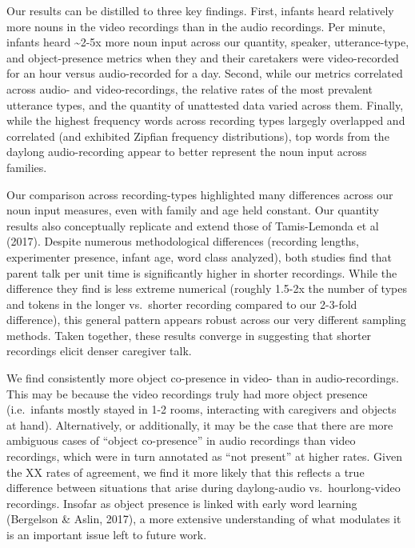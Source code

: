 \documentclass[floatsintext,man]{apa6}
\theoremstyle{definition}
\theoremstyle{definition}
\theoremstyle{definition}
\theoremstyle{remark}
\begin{document}
Our results can be distilled to three key findings. First, infants heard
relatively more nouns in the video recordings than in the audio
recordings. Per minute, infants heard \textasciitilde{}2-5x more noun
input across our quantity, speaker, utterance-type, and object-presence
metrics when they and their caretakers were video-recorded for an hour
versus audio-recorded for a day. Second, while our metrics correlated
across audio- and video-recordings, the relative rates of the most
prevalent utterance types, and the quantity of unattested data varied
across them. Finally, while the highest frequency words across recording
types largegly overlapped and correlated (and exhibited Zipfian
frequency distributions), top words from the daylong audio-recording
appear to better represent the noun input across families.

Our comparison across recording-types highlighted many differences
across our noun input measures, even with family and age held constant.
Our quantity results also conceptually replicate and extend those of
Tamis-Lemonda et al (2017). Despite numerous methodological differences
(recording lengths, experimenter presence, infant age, word class
analyzed), both studies find that parent talk per unit time is
significantly higher in shorter recordings. While the difference they
find is less extreme numerical (roughly 1.5-2x the number of types and
tokens in the longer vs.~shorter recording compared to our 2-3-fold
difference), this general pattern appears robust across our very
different sampling methods. Taken together, these results converge in
suggesting that shorter recordings elicit denser caregiver talk.

We find consistently more object co-presence in video- than in
audio-recordings. This may be because the video recordings truly had
more object presence (i.e.~infants mostly stayed in 1-2 rooms,
interacting with caregivers and objects at hand). Alternatively, or
additionally, it may be the case that there are more ambiguous cases of
\enquote{object co-presence} in audio recordings than video recordings,
which were in turn annotated as \enquote{not present} at higher rates.
Given the XX rates of agreement, we find it more likely that this
reflects a true difference between situations that arise during
daylong-audio vs.~hourlong-video recordings. Insofar as object presence
is linked with early word learning (Bergelson \& Aslin, 2017), a more
extensive understanding of what modulates it is an important issue left
to future work.
\end{document}
